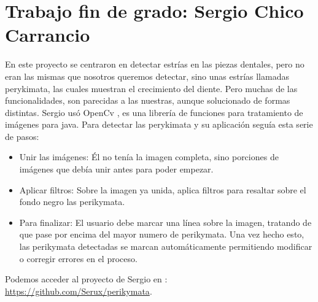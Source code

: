 \section{Trabajo fin de grado: Sergio Chico Carrancio}
En este proyecto se centraron en detectar estrías en las piezas dentales, pero no eran las mismas que nosotros queremos detectar, sino unas estrías llamadas perykimata, las cuales muestran el crecimiento del diente. Pero muchas de las funcionalidades, son parecidas a las nuestras, aunque solucionado de formas distintas.
Sergio usó OpenCv \cite{opencv:wiki}, es una librería de funciones para tratamiento de imágenes para java. Para detectar las perykimata y su aplicación seguía esta serie de pasos:
\begin{itemize}
\item Unir las imágenes: Él no tenía la imagen completa, sino porciones de imágenes que debía unir antes para poder empezar.
\item Aplicar filtros: Sobre la imagen ya unida, aplica filtros para resaltar sobre el fondo negro las perikymata.
\item Para finalizar: El usuario debe marcar una línea sobre la imagen, tratando de que pase por encima del mayor numero de perikymata. Una vez hecho esto, las perikymata detectadas se marcan automáticamente permitiendo modificar o corregir errores en el proceso.
\end{itemize}

Podemos acceder al proyecto de Sergio en : \url{https://github.com/Serux/perikymata}.